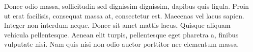 Donec odio massa, sollicitudin sed dignissim dignissim, dapibus quis ligula. Proin ut erat facilisis, consequat massa at, consectetur est. Maecenas vel lacus sapien. Integer non interdum neque. Donec sit amet mattis lacus. Quisque aliquam vehicula pellentesque. Aenean elit turpis, pellentesque eget pharetra a, finibus vulputate nisi. Nam quis nisi non odio auctor porttitor nec elementum massa.